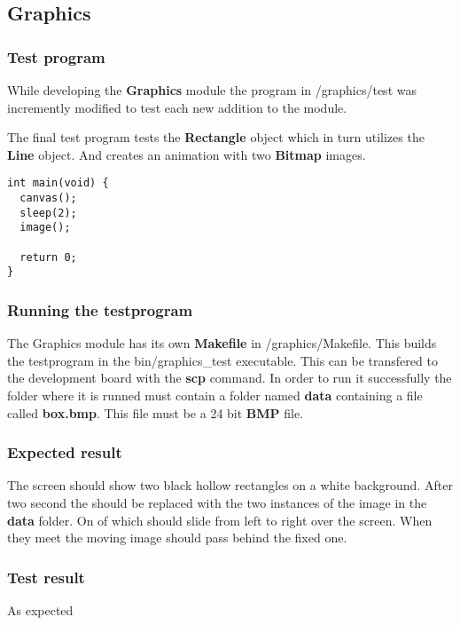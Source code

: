 \subsection{Graphics}

\subsubsection{Test program}
While developing the {\bf Graphics} module the program in
/graphics/test was incremently modified to test each new addition to
the module.

The final test program tests the {\bf Rectangle} object which in turn
utilizes the {\bf Line} object. And creates an animation with two {\bf
  Bitmap} images.

\begin{lstlisting}
int main(void) {
  canvas();
  sleep(2);
  image();

  return 0;
}
\end{lstlisting}

\subsubsection{Running the testprogram}
The Graphics module has its own {\bf Makefile} in /graphics/Makefile.
This builds the testprogram in the bin/graphics\_test executable. This
can be transfered to the development board with the {\bf scp}
command. In order to run it successfully the folder where it is runned
must contain a folder named {\bf data} containing a file called {\bf
  box.bmp}. This file must be a 24 bit {\bf BMP} file.

\subsubsection{Expected result}
The screen should show two black hollow rectangles on a white
background. After two second the should be replaced with the two
instances of the image in the {\bf data} folder. On of which should
slide from left to right over the screen. When they meet the moving
image should pass behind the fixed one.

\subsubsection{Test result}
As expected
